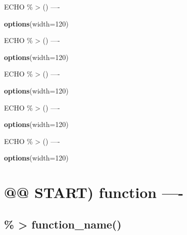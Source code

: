 \documentclass[
]{article}
\newenvironment{Shaded}{\begin{snugshade}}{\end{snugshade}}
\newcommand{\AttributeTok}[1]{\textcolor[rgb]{0.13,0.29,0.53}{#1}}
\newcommand{\DecValTok}[1]{\textcolor[rgb]{0.00,0.00,0.81}{#1}}
\newcommand{\FunctionTok}[1]{\textcolor[rgb]{0.13,0.29,0.53}{\textbf{#1}}}
\newcommand{\NormalTok}[1]{#1}
\begin{document}
ECHO \% \textbar\textgreater{} () ----

\begin{Shaded}
\begin{Highlighting}[]
\FunctionTok{options}\NormalTok{(}\AttributeTok{width=}\DecValTok{120}\NormalTok{)}
\end{Highlighting}
\end{Shaded}

ECHO \% \textbar\textgreater{} () ----

\begin{Shaded}
\begin{Highlighting}[]
\FunctionTok{options}\NormalTok{(}\AttributeTok{width=}\DecValTok{120}\NormalTok{)}
\end{Highlighting}
\end{Shaded}

ECHO \% \textbar\textgreater{} () ----

\begin{Shaded}
\begin{Highlighting}[]
\FunctionTok{options}\NormalTok{(}\AttributeTok{width=}\DecValTok{120}\NormalTok{)}
\end{Highlighting}
\end{Shaded}

ECHO \% \textbar\textgreater{} () ----

\begin{Shaded}
\begin{Highlighting}[]
\FunctionTok{options}\NormalTok{(}\AttributeTok{width=}\DecValTok{120}\NormalTok{)}
\end{Highlighting}
\end{Shaded}

ECHO \% \textbar\textgreater{} () ----

\begin{Shaded}
\begin{Highlighting}[]
\FunctionTok{options}\NormalTok{(}\AttributeTok{width=}\DecValTok{120}\NormalTok{)}
\end{Highlighting}
\end{Shaded}

\hypertarget{start-function--}{%
\section{@@ START) function ----}\label{start-function--}}

\hypertarget{function_name}{%
\subsection{\% \textbar\textgreater{}
function\_name()}\label{function_name}}
\end{document}

